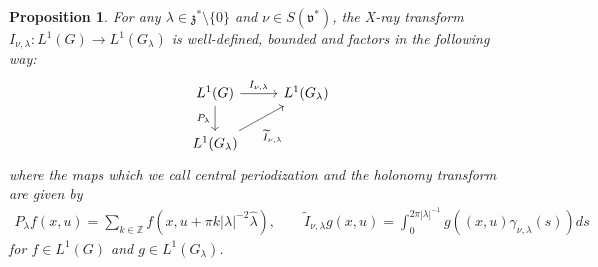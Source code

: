 \documentclass[10pt,a4paper]{amsart}
\newtheorem{proposition}{Proposition}
\def\fv{\mathfrak{v}}
\begin{document}
\begin{proposition}\label{factorization}
	For any $\lambda\in \mathfrak{z}^*\setminus \{0\}$ and $\nu\in S(\fv^*)$, the X-ray transform $I_{\nu, \lambda}: L^1(G)\to L^1(G_\lambda)$ is well-defined, bounded and factors in the following way:
	\[ 
	\begin{tikzcd}
		L^1(G) \arrow[d, "P_{\lambda}" left=1]  \arrow[r, "{I}_{\nu, \lambda}"]  &L^1(G_\lambda)\\
		L^1(G_{\lambda}) \arrow[ur, "\widetilde{I}_{\nu, \lambda}" below=10, pos=0.75]
	\end{tikzcd}
	\]
	where the maps which we call \textit{central periodization} and the \textit{holonomy transform} are given by 
	\begin{align*}
		P_{\lambda}f(x, u)=\sum_{k\in\mathbb{Z}}f(x, u+\pi k |\lambda|^{-2}\hat{\lambda}), 
		\quad \quad
		\widetilde{I}_{\nu, \lambda}g(x, u)=\int_0^{2\pi |\lambda|^{-1}}g\left( (x, u)\gamma_{\nu, \lambda}(s)\right)ds
	\end{align*}
	for $f\in L^1(G)$ and $g\in L^1(G_\lambda)$.
\end{proposition}
\end{document}
